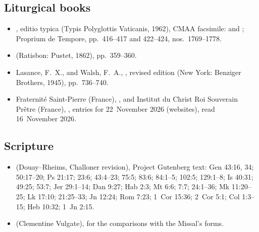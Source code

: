 {\small
\subsection*{Liturgical books}
\begin{itemize}[leftmargin=1.2em,itemsep=.25em]
\item {}, editio typica (Typis
Polyglottis Vaticanis, 1962), CMAA facsimile:  and
; Proprium de Tempore, pp.~416--417
and 422--424, nos.~1769--1778.
\item {} (Ratisbon: Pustet, 1862), pp.~359--360.
\item Lasance, F.~X., and Walsh, F.~A., , revised edition (New York: Benziger Brothers, 1945), pp.~736--740.
\item Fraternité Saint-Pierre (France), , and Institut du
Christ Roi Souverain Prêtre (France), , entries for 22~November
2026 (websites), read 16~November 2026.
\end{itemize}

\subsection*{Scripture}
\begin{itemize}[leftmargin=1.2em,itemsep=.25em]
\item {} (Douay--Rheims,
Challoner revision), Project Gutenberg text: Gen 43:16, 34; 50:17--20; Ps
21:17; 23:6; 43:4--23; 75:5; 83:6; 84:1--5; 102:5; 129:1--8; Is 40:31; 49:25;
53:7; Jer 29:1--14; Dan 9:27; Hab 2:3; Mt 6:6; 7:7; 24:1--36; Mk 11:20--25;
Lk 17:10; 21:25--33; Jn 12:24; Rom 7:23; 1~Cor 15:36; 2~Cor 5:1; Col
1:3--15; Heb 10:32; 1~Jn 2:15.
\item {} (Clementine Vulgate), for the
comparisons with the Missal's forms.
\end{itemize}

}
